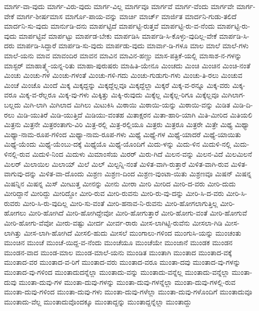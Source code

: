 {ಮಾರ್ಗ-ವಾ-ವುದು
ಮಾರ್ಗ-ವಿರು-ವುದು
ಮಾರ್ಗ-ವಿಲ್ಲ
ಮಾರ್ಗವೂ
ಮಾರ್ಗವೆ
ಮಾರ್ಗ-ವೆಂದು
ಮಾರ್ಗವೇ
ಮಾರ್ಗ-ವೇಕೆ
ಮಾರ್ಗ-ಶೀರ್ಷಮಾಸ
ಮಾರ್ಗೊ-ಪಾಯ-ವನ್ನು
ಮಾರ್ಚಿ
ಮಾರ್ಚ್
ಮಾರ್ಜಿತ
ಮಾರ್ದನಿ-ಗುಡು-ತಲಿದೆ
ಮಾರ್ದನಿ-ಸು-ವುದು
ಮಾರ್ನುಡಿ-ದನು
ಮಾರ್ಪಟ್ಟಿದೆ
ಮಾರ್ಪಟ್ಟಿ-ರುತ್ತವೆ
ಮಾರ್ಪಟ್ಟಿ-ರು-ವ-ನೆಂದು
ಮಾರ್ಪಟ್ಟಿ-ರು-ವುದು
ಮಾರ್ಪಟ್ಟಿವೆ
ಮಾರ್ಪಟ್ಟು
ಮಾರ್ಪಡ-ಬೇಕು
ಮಾರ್ಪಡಿಸಿ
ಮಾರ್ಪಡಿ-ಸಿ-ಕೊಳ್ಳು-ವುದಿಲ್ಲ-ವೇಕೆ
ಮಾರ್ಪಡಿ-ಸಿ-ದರು
ಮಾರ್ಪಡಿ-ಸಿದ್ದಾರೆ
ಮಾರ್ಪಡಿ-ಸು-ವುದು
ಮಾರ್ಪಡು-ವುದು
ಮಾರ್ವಾ-ಡಿ-ಗಳೂ
ಮಾಲ
ಮಾಲೆ
ಮಾಲೆ-ಗಳು
ಮಾಲೆ-ಯನು
ಮಾವ
ಮಾವಂದಿರ
ಮಾವನ
ಮಾವಿನ
ಮಾವಿನ-ಹಣ್ಣು
ಮಾಸ-ಪತ್ರಿಕೆ-ಯಲ್ಲಿ
ಮಾಸಾಶ-ನ-ಗಳನ್ನು
ಮಾಸ್ಟರ್
ಮಾಹಾತ್ಮ್ಯೆ-ಯನ್ನ-ರಿತು
ಮಾಹಾ-ಪುರುಷರು
ಮಾಹಿತಿ-ಯೇನೂ
ಮಿಂಚದು
ಮಿಂಚಿ
ಮಿಂಚಿನ
ಮಿಂಚಿ-ನಂತೆ
ಮಿಂಚು
ಮಿಂಚು-ಗಳ
ಮಿಂಚು-ಗಳಂತೆ
ಮಿಂಚು-ಗಳಿ-ಗದು
ಮಿಂಚು-ಗುಡುಗು-ಗಳು
ಮಿಂಚು-ತಿ-ರಲು
ಮಿಂಚುವ
ಮಿಂಚೆ
ಮಿಂಚೊ
ಮಿಂದೆ
ಮಿಕ್ಕ
ಮಿಕ್ಕದ್ದನ್ನು
ಮಿಕ್ಕದ್ದೆಲ್ಲವೂ
ಮಿಕ್ಕದ್ದೆಲ್ಲಾ
ಮಿಕ್ಕರೆ
ಮಿಕ್ಕ-ವ-ರನ್ನೂ
ಮಿಕ್ಕ-ವರು
ಮಿಕ್ಕ-ವರೂ
ಮಿಕ್ಕ-ವ-ರೆಲ್ಲರೂ
ಮಿಕ್ಕ-ವು-ಗಳು
ಮಿಕ್ಕಿತ್ತು
ಮಿಕ್ಕಿ-ರುವುದು
ಮಿಕ್ಕೆಲ್ಲ
ಮಿಕ್ಕೆಲ್ಲ-ರಿಗೂ
ಮಿಕ್ಕೆಲ್ಲವೂ
ಮಿಗಿಲಾಗ-ಬಲ್ಲದು
ಮಿಗಿ-ಲಾಗಿ
ಮಿಗಿಲಾದ
ಮಿಗಿಲು
ಮಿಟುಕಿಸಿ
ಮಿಠಾಯಿ
ಮಿಠಾಯಿ-ಯನ್ನು
ಮಿಠಾಯಿ-ವನ್ನು
ಮಿಡಿತ
ಮಿಡಿ-ದಿ-ರಲು
ಮಿಡಿ-ಯುತಿರೆ
ಮಿಡಿ-ಯುತ್ತಿದೆ
ಮಿಡಿಯು-ವಂತಹ
ಮಿತಾಕ್ಷರನ
ಮಿತಾ-ಹಾರಿ-ಯಾಗಿ
ಮಿತಿ-ಮೀರಿದ
ಮಿತಿಯಲಿ
ಮಿತ್ರನು
ಮಿತ್ರನೇ
ಮಿತ್ರರಂತಾಗು-ವಿರಿ
ಮಿತ್ರ-ರಲ್ಲಿ
ಮಿತ್ರ-ರಲ್ಲಿಯೂ
ಮಿತ್ರರು
ಮಿತ್ರರೂ
ಮಿತ್ರರೇ
ಮಿತ್ರೇ
ಮಿಥ್ಯ
ಮಿಥ್ಯಾ
ಮಿಥ್ಯಾ-ನಾಮ-ರೂಪ-ಗಳಿಂದ
ಮಿಥ್ಯಾ-ನಾಮ-ರೂಪ-ಗಳು
ಮಿಥ್ಯೆ
ಮಿಥ್ಯೆ-ಗಳ
ಮಿಥ್ಯೆ-ಯಾದರೆ
ಮಿಥ್ಯೆ-ಯಾಯಿತು
ಮಿಥ್ಯೆ-ಯೆಂದು
ಮಿಥ್ಯೆ-ಯೆಂಬು-ದಕ್ಕೆ
ಮಿಥ್ಯೆಯೊ
ಮಿಥ್ಯೆ-ಯೊಂದಿಗೆ
ಮಿದು-ಳನ್ನು
ಮಿದು-ಳಿನ
ಮಿದುಳಿ-ನಲ್ಲಿ
ಮಿದು-ಳಿನಲ್ಲಿ-ರುವ
ಮಿದುಳಿ-ನಿಂದ
ಮಿದುಳು
ಮಿಮಾಂಸೆಯ
ಮಿರರ್
ಮಿರು-ಗಿದೆ
ಮಿಲನ-ವನ್ನು
ಮಿಲನ-ವಿದೆ
ಮಿಲಮಿಲನೆ
ಮಿಲರ್
ಮಿಲಾಯಿಲ
ಮಿಲಾಯ್
ಮಿಲೆ
ಮಿಲ್
ಮಿಲ್ಟನ್ನಿ-ನಂತೆ
ಮಿಳಿತ-ವಾಗಿ-ರುತ್ತಾರೆ
ಮಿಳಿತ-ವಾಗಿ-ರುವ
ಮಿಳಿತ-ವಾಗುವು-ದನ್ನು
ಮಿಳಿತ-ವಾ-ದೊಂದು
ಮಿಶ್ರಣ
ಮಿಶ್ರಣ-ದಿಂದ
ಮಿಶ್ರಣ-ವುಂಟಾ-ಯಿತು
ಮಿಶ್ರಣವೂ
ಮಿಷನ್
ಮಿಷನ್ನ
ಮಿಷನ್ನಿನ
ಮಿಷನ್ನ
ಮಿಸ್
ಮೀಟುತ್ತ
ಮೀನನ್ನು
ಮೀನು
ಮೀರಾ
ಮೀರಿ
ಮೀರಿದ
ಮೀರಿ-ದ-ವರು
ಮೀರಿ-ದುದು
ಮೀರಿದ್ದಾನೆ
ಮೀರಿದ್ದು
ಮೀರಿದ್ದೋ
ಮೀರಿ-ರುವ
ಮೀರಿ-ರುವನು
ಮೀರಿ-ರು-ವು-ದನ್ನು
ಮೀರಿ-ಸಿ-ದ-ವರು
ಮೀರಿ-ಸಿ-ರುವರು
ಮೀರಿ-ಸಿ-ರು-ವುದಿಲ್ಲ
ಮೀರಿ-ಸು-ವಂತೆ
ಮೀರಿ-ಹನಾವ-ನಿ-ರುವನು
ಮೀರಿ-ಹೋಗಲಾಗುತ್ತಿಲ್ಲ
ಮೀರಿ-ಹೋಗಲು
ಮೀರಿ-ಹೋಗಿದೆ
ಮೀರಿ-ಹೋಗಿದ್ದೇವೋ
ಮೀರಿ-ಹೋಗುತ್ತಾರೆ
ಮೀರಿ-ಹೋಗು-ವಂತೆ
ಮೀರಿ-ಹೋಗುವೆ
ಮೀರಿ-ಹೋಗು-ವೆವೋ
ಮೀರು-ವಷ್ಟು
ಮೀರ್ದ
ಮೀರ್ವ-ರಾರು
ಮೀಸ-ಲಾಗಿಟ್ಟಿ-ರುವೆನು
ಮೀಸಲಾ-ಗಿಡಿ
ಮೀಸ-ಲಾಗಿತ್ತು
ಮೀಸ-ಲಾಗಿ-ಹೋಗಿದೆ
ಮೀಸಲಿ-ಹುದು
ಮೀಸಲೆ
ಮುಂಗಾಲು-ಗಳಿಂದ
ಮುಂಗುಸಿ-ಯನ್ನು
ಮುಂಚಂತು
ಮುಂಚಿನ
ಮುಂಚೆ
ಮುಂಚೆ-ಯಿದ್ದ-ವ-ನೆಂದು
ಮುಂಚೆಯೂ
ಮುಂಚೆಯೇ
ಮುಂಜಾನೆ
ಮುಂಡಕ
ಮುಂಡನ
ಮುಂಡನ-ವಾದ
ಮುಂಡ-ಮಾಲ
ಮುಂಡ-ಮಾಲೆ-ಯನು
ಮುಂಡಿತ
ಮುಂತಾಗಿ
ಮುಂತಾದ
ಮುಂತಾದ-ವಕ್ಕೆ
ಮುಂತಾದ-ವರ
ಮುಂತಾದ-ವ-ರಿಗೆ
ಮುಂತಾದ-ವರು
ಮುಂತಾದ-ವರೂ
ಮುಂತಾ-ದವು
ಮುಂತಾದ-ವು-ಗಳನ್ನು
ಮುಂತಾದ-ವು-ಗಳಿಂದ
ಮುಂತಾದುದನ್ನೆಲ್ಲಾ
ಮುಂತಾದು-ವನ್ನು
ಮುಂತಾದು-ವನ್ನೆಲ್ಲ
ಮುಂತಾದು-ವನ್ನೆಲ್ಲಾ
ಮುಂತಾ-ದುವು
ಮುಂತಾ-ದುವು-ಗಳ
ಮುಂತಾ-ದುವು-ಗಳನ್ನು
ಮುಂತಾ-ದುವು-ಗಳನ್ನೆಲ್ಲಾ
ಮುಂತಾ-ದುವು-ಗಳಲ್ಲಿ-ರುವ
ಮುಂತಾ-ದುವು-ಗಳಿಂದ
ಮುಂತಾ-ದುವು-ಗಳು
ಮುಂತಾ-ದುವು-ಗಳೆಲ್ಲಾ
ಮುಂತಾ-ದುವು-ಗಳೊಂದಿಗೆ
ಮುಂತಾದುವೂ
ಮುಂತಾದು-ವೆಲ್ಲ
ಮುಂತಾದುವೊಂದಕ್ಕೂ
ಮುಂತಾದ್ದನ್ನು
ಮುಂತಾದ್ದನ್ನೆಲ್ಲಾ
ಮುಂತಾದ್ದು
}
